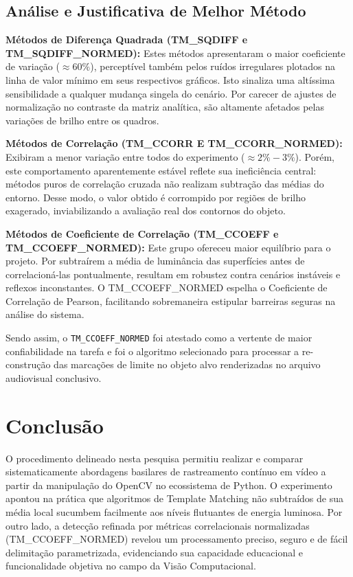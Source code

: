 \documentclass[12pt]{article}
\begin{document}
\subsection{Análise e Justificativa de Melhor Método}
\textbf{Métodos de Diferença Quadrada (TM\_SQDIFF e TM\_SQDIFF\_NORMED):} Estes métodos apresentaram o maior coeficiente de variação ($\approx 60\%$), perceptível também pelos ruídos irregulares plotados na linha de valor mínimo em seus respectivos gráficos. Isto sinaliza uma altíssima sensibilidade a qualquer mudança singela do cenário. Por carecer de ajustes de normalização no contraste da matriz analítica, são altamente afetados pelas variações de brilho entre os quadros.

\textbf{Métodos de Correlação (TM\_CCORR E TM\_CCORR\_NORMED):} Exibiram a menor variação entre todos do experimento ($\approx 2\% - 3\%$). Porém, este comportamento aparentemente estável reflete sua ineficiência central: métodos puros de correlação cruzada não realizam subtração das médias do entorno. Desse modo, o valor obtido é corrompido por regiões de brilho exagerado, inviabilizando a avaliação real dos contornos do objeto.

\textbf{Métodos de Coeficiente de Correlação (TM\_CCOEFF e TM\_CCOEFF\_NORMED):} Este grupo ofereceu maior equilíbrio para o projeto. Por subtraírem a média de luminância das superfícies antes de correlacioná-las pontualmente, resultam em robustez contra cenários instáveis e reflexos inconstantes. O TM\_CCOEFF\_NORMED espelha o Coeficiente de Correlação de Pearson, facilitando sobremaneira estipular barreiras seguras na análise do sistema.

Sendo assim, o \texttt{TM\_CCOEFF\_NORMED} foi atestado como a vertente de maior confiabilidade na tarefa e foi o algoritmo selecionado para processar a re-construção das marcações de limite no objeto alvo renderizadas no arquivo audiovisual conclusivo.

\section{Conclusão}
O procedimento delineado nesta pesquisa permitiu realizar e comparar sistematicamente abordagens basilares de rastreamento contínuo em vídeo a partir da manipulação do OpenCV no ecossistema de Python. O experimento apontou na prática que algoritmos de Template Matching não subtraídos de sua média local sucumbem facilmente aos níveis flutuantes de energia luminosa. Por outro lado, a detecção refinada por métricas correlacionais normalizadas (TM\_CCOEFF\_NORMED) revelou um processamento preciso, seguro e de fácil delimitação parametrizada, evidenciando sua capacidade educacional e funcionalidade objetiva no campo da Visão Computacional.
\end{document}
